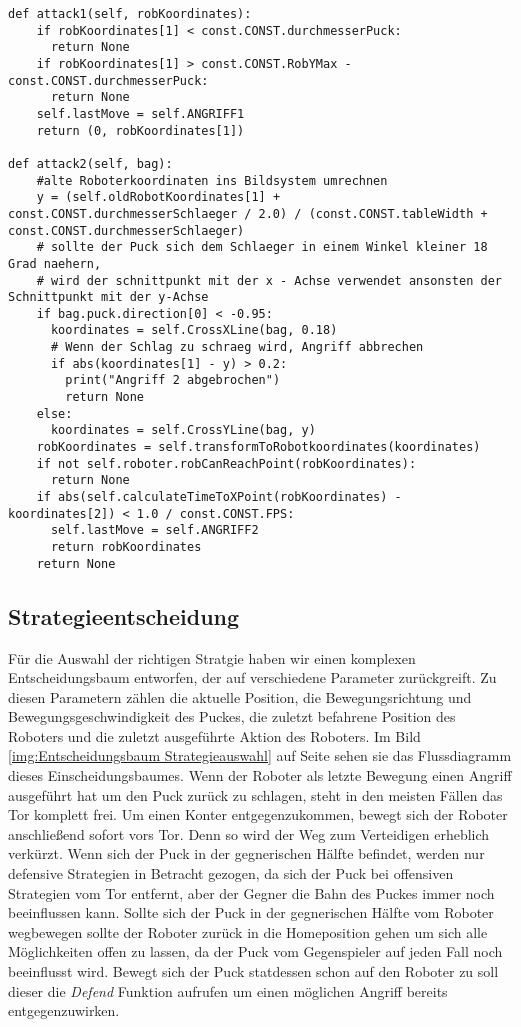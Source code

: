 \begin{lstlisting}[caption= python-funktion für Offensivstrategien, label=lst:Offensivstrategien]
def attack1(self, robKoordinates):
	if robKoordinates[1] < const.CONST.durchmesserPuck:
	  return None
	if robKoordinates[1] > const.CONST.RobYMax - const.CONST.durchmesserPuck:
	  return None
	self.lastMove = self.ANGRIFF1
	return (0, robKoordinates[1])
    
def attack2(self, bag):
	#alte Roboterkoordinaten ins Bildsystem umrechnen
	y = (self.oldRobotKoordinates[1] + const.CONST.durchmesserSchlaeger / 2.0) / (const.CONST.tableWidth +  const.CONST.durchmesserSchlaeger)
	# sollte der Puck sich dem Schlaeger in einem Winkel kleiner 18 Grad naehern,
	# wird der schnittpunkt mit der x - Achse verwendet ansonsten der Schnittpunkt mit der y-Achse
	if bag.puck.direction[0] < -0.95:
	  koordinates = self.CrossXLine(bag, 0.18)
	  # Wenn der Schlag zu schraeg wird, Angriff abbrechen
	  if abs(koordinates[1] - y) > 0.2:
	    print("Angriff 2 abgebrochen")
	    return None
	else:
	  koordinates = self.CrossYLine(bag, y)	
	robKoordinates = self.transformToRobotkoordinates(koordinates)
	if not self.roboter.robCanReachPoint(robKoordinates):
	  return None
	if abs(self.calculateTimeToXPoint(robKoordinates) - koordinates[2]) < 1.0 / const.CONST.FPS:
	  self.lastMove = self.ANGRIFF2
	  return robKoordinates
	return None
\end{lstlisting}

\subsection{Strategieentscheidung}
\label{sec:Strategieentscheidung}
Für die Auswahl der richtigen Stratgie haben wir einen komplexen Entscheidungsbaum entworfen, der auf verschiedene Parameter zurückgreift. Zu diesen Parametern zählen die aktuelle Position, die Bewegungsrichtung und Bewegungsgeschwindigkeit des Puckes, die zuletzt befahrene Position des Roboters und die zuletzt ausgeführte Aktion des Roboters. Im Bild \ref{img:Entscheidungsbaum Strategieauswahl} auf Seite \pageref{img:Entscheidungsbaum Strategieauswahl} sehen sie das Flussdiagramm dieses Einscheidungsbaumes. Wenn der Roboter als letzte Bewegung einen Angriff ausgeführt hat um den Puck zurück zu schlagen, steht in den meisten Fällen das Tor komplett frei. Um einen Konter entgegenzukommen, bewegt sich der Roboter anschließend sofort vors Tor. Denn so wird der Weg zum Verteidigen erheblich verkürzt. Wenn sich der Puck in der gegnerischen Hälfte befindet, werden nur defensive Strategien in Betracht gezogen, da sich der Puck bei offensiven Strategien vom Tor entfernt, aber der Gegner die Bahn des Puckes immer noch beeinflussen kann. Sollte sich der Puck in der gegnerischen Hälfte vom Roboter wegbewegen sollte der Roboter zurück in die Homeposition gehen um sich alle Möglichkeiten offen zu lassen, da der Puck vom Gegenspieler auf jeden Fall noch beeinflusst wird. Bewegt sich der Puck statdessen schon auf den Roboter zu soll dieser die \textit{Defend} Funktion aufrufen um einen möglichen Angriff bereits entgegenzuwirken.


